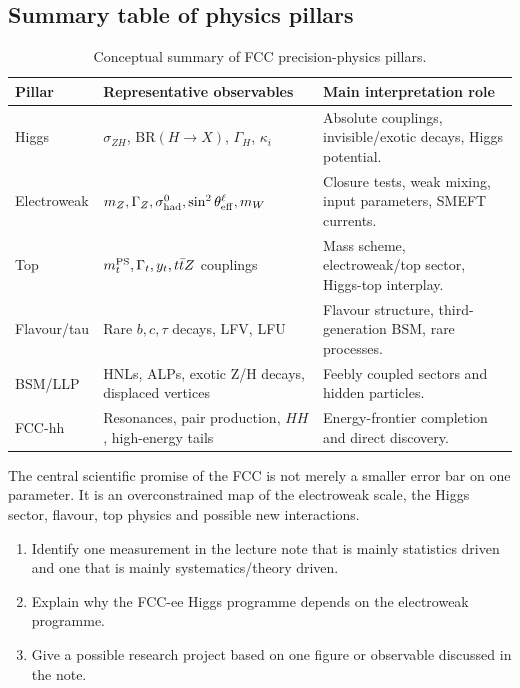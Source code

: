 \documentclass[11pt,a4paper]{article}
\newcommand{\BR}{\mathrm{BR}}
\newcommand{\mZ}{m_Z}
\newcommand{\mW}{m_W}
\newcommand{\sintw}{\sin^2\theta_{\rm eff}^{\ell}}
\numberwithin{equation}{section}
\begin{document}
\subsection{Summary table of physics pillars}
\begin{table}[H]
\centering
\caption{Conceptual summary of FCC precision-physics pillars.}
\label{tab:summary-pillars}
\begin{tabularx}{\textwidth}{@{}p{2.7cm}p{3.4cm}X@{}}
\toprule
Pillar & Representative observables & Main interpretation role\\
\midrule
Higgs & \(\sigma_{ZH}\), \(\BR(H\to X)\), \(\Gamma_H\), \(\kappa_i\) & Absolute couplings, invisible/exotic decays, Higgs potential.\\
Electroweak & \(\mZ,\Gamma_Z,\sigma^0_{\rm had},\sintw,\mW\) & Closure tests, weak mixing, input parameters, SMEFT currents.\\
Top & \(m_t^{\rm PS},\Gamma_t,y_t,t\bar tZ\) couplings & Mass scheme, electroweak/top sector, Higgs-top interplay.\\
Flavour/tau & Rare \(b,c,\tau\) decays, LFV, LFU & Flavour structure, third-generation BSM, rare processes.\\
BSM/LLP & HNLs, ALPs, exotic Z/H decays, displaced vertices & Feebly coupled sectors and hidden particles.\\
FCC-hh & Resonances, pair production, \(HH\), high-energy tails & Energy-frontier completion and direct discovery.\\
\bottomrule
\end{tabularx}
\end{table}

\begin{takehomebox}
The central scientific promise of the FCC is not merely a smaller error bar on one parameter. It is an overconstrained map of the electroweak scale, the Higgs sector, flavour, top physics and possible new interactions.
\end{takehomebox}

\begin{guidedchecksbox}
\begin{enumerate}[leftmargin=1.6em]
\item Identify one measurement in the lecture note that is mainly statistics driven and one that is mainly systematics/theory driven.
\item Explain why the FCC-ee Higgs programme depends on the electroweak programme.
\item Give a possible research project based on one figure or observable discussed in the note.
\end{enumerate}
\end{guidedchecksbox}
\end{document}
